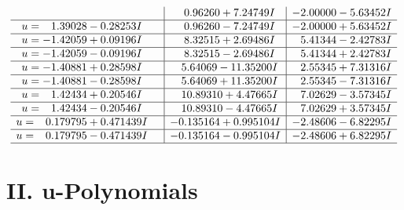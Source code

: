 \documentclass[1p]{elsarticle_modified}
\theoremstyle{definition}
\begin{document}
$$\begin{array}{c|c|c}
 & \phantom{-}0.96260 + 7.24749 I & -2.00000 - 5.63452 I \\ \hline\begin{aligned}
u &= \phantom{-}1.39028 - 0.28253 I\end{aligned}
 & \phantom{-}0.96260 - 7.24749 I & -2.00000 + 5.63452 I \\ \hline\begin{aligned}
u &= -1.42059 + 0.09196 I\end{aligned}
 & \phantom{-}8.32515 + 2.69486 I & \phantom{-}5.41344 - 2.42783 I \\ \hline\begin{aligned}
u &= -1.42059 - 0.09196 I\end{aligned}
 & \phantom{-}8.32515 - 2.69486 I & \phantom{-}5.41344 + 2.42783 I \\ \hline\begin{aligned}
u &= -1.40881 + 0.28598 I\end{aligned}
 & \phantom{-}5.64069 - 11.35200 I & \phantom{-}2.55345 + 7.31316 I \\ \hline\begin{aligned}
u &= -1.40881 - 0.28598 I\end{aligned}
 & \phantom{-}5.64069 + 11.35200 I & \phantom{-}2.55345 - 7.31316 I \\ \hline\begin{aligned}
u &= \phantom{-}1.42434 + 0.20546 I\end{aligned}
 & \phantom{-}10.89310 + 4.47665 I & \phantom{-}7.02629 - 3.57345 I \\ \hline\begin{aligned}
u &= \phantom{-}1.42434 - 0.20546 I\end{aligned}
 & \phantom{-}10.89310 - 4.47665 I & \phantom{-}7.02629 + 3.57345 I \\ \hline\begin{aligned}
u &= \phantom{-}0.179795 + 0.471439 I\end{aligned}
 & -0.135164 + 0.995104 I & -2.48606 - 6.82295 I \\ \hline\begin{aligned}
u &= \phantom{-}0.179795 - 0.471439 I\end{aligned}
 & -0.135164 - 0.995104 I & -2.48606 + 6.82295 I\\
 \hline 
 \end{array}$$\newpage
\newpage\renewcommand{\arraystretch}{1}
\centering \section*{ II. u-Polynomials}
\end{document}
